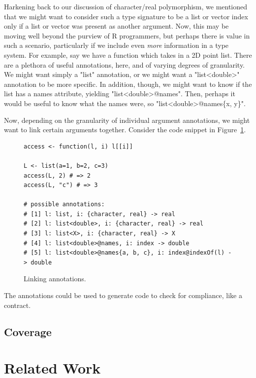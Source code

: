 \documentclass[acmsmall,10pt,review,anonymous]{acmart}\settopmatter{printfolios=true,printccs=false,printacmref=false}
\begin{document}
Harkening back to our discussion of character/real polymorphism, we mentioned that we might want to consider such a type signature to be a list or vector index only if a list or vector was present as another argument.
Now, this may be moving well beyond the purview of R programmers, but perhaps there is value in such a scenario, particularly if we include even {\it more} information in a type system.
For example, say we have a function which takes in a 2D point list.
There are a plethora of useful annotations, here, and of varying degrees of granularity.
We might want simply a "list" annotation, or we might want a "list<double>" annotation to be more specific.
In addition, though, we might want to know if the list has a names attribute, yielding "list<double>@names".
Then, perhaps it would be useful to know what the names were, so "list<double>@names\{x, y\}".

Now, depending on the granularity of individual argument annotations, we might want to link certain arguments together.
Consider the code snippet in Figure~\ref{fig:indexof}.
\begin{figure}[!hb]{\small\begin{lstlisting}[style=R]
access <- function(l, i) l[[i]]

L <- list(a=1, b=2, c=3)
access(L, 2) # => 2
access(L, "c") # => 3

# possible annotations:
# [1] l: list, i: {character, real} -> real
# [2] l: list<double>, i: {character, real} -> real
# [3] l: list<X>, i: {character, real} -> X
# [4] l: list<double>@names, i: index -> double
# [5] l: list<double>@names{a, b, c}, i: index@indexOf(l) -> double
\end{lstlisting}}\caption{Linking annotations.}\label{fig:indexof}\end{figure}
The annotations could be used to generate code to check for compliance, like a contract.

%
%
%
%
\subsection{Coverage}


%
%
%
%
\section{Related Work}

\end{document}
